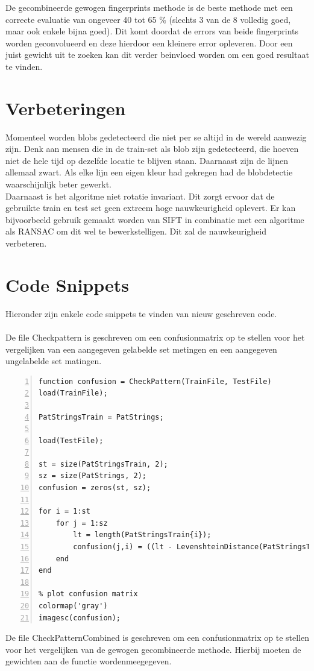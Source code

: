 \documentclass[a4paper]{article}
\begin{document}
De gecombineerde gewogen fingerprints methode is de beste methode met een correcte evaluatie van ongeveer 40 tot 65 \% (slechts 3 van de 8 volledig goed, maar ook enkele bijna goed). Dit komt doordat de errors van beide fingerprints worden geconvolueerd en deze hierdoor een kleinere error opleveren. Door een juist gewicht uit te zoeken kan dit verder beinvloed worden om een goed resultaat te vinden.

\section{Verbeteringen}
Momenteel worden blobs gedetecteerd die niet per se altijd in de wereld aanwezig zijn. Denk aan mensen die in de train-set als blob zijn gedetecteerd, die hoeven niet de hele tijd op dezelfde locatie te blijven staan. Daarnaast zijn de lijnen allemaal zwart. Als elke lijn een eigen kleur had gekregen had de blobdetectie waarschijnlijk beter gewerkt.\\
Daarnaast is het algoritme niet rotatie invariant. Dit zorgt ervoor dat de gebruikte train en test set geen extreem hoge nauwkeurigheid oplevert. Er kan bijvoorbeeld gebruik gemaakt worden van SIFT in combinatie met een algoritme als RANSAC om dit wel te bewerkstelligen. Dit zal de nauwkeurigheid verbeteren.

\section{Code Snippets}
Hieronder zijn enkele code snippets te vinden van nieuw geschreven code.\\\\
De file Checkpattern is geschreven om een confusionmatrix op te stellen voor het vergelijken van een aangegeven gelabelde set metingen en een aangegeven ungelabelde set matingen.
\begin{lstlisting}[caption= CheckPattern.m, label=lst:checkpattern, numbers=left]
function confusion = CheckPattern(TrainFile, TestFile)
load(TrainFile);

PatStringsTrain = PatStrings;

load(TestFile);

st = size(PatStringsTrain, 2);   
sz = size(PatStrings, 2);
confusion = zeros(st, sz);

for i = 1:st
	for j = 1:sz
        lt = length(PatStringsTrain{i});
	    confusion(j,i) = ((lt - LevenshteinDistance(PatStringsTrain{i}, PatStrings{j})) / lt) * 100;
	end
end

% plot confusion matrix
colormap('gray')
imagesc(confusion);
\end{lstlisting}
De file CheckPatternCombined is geschreven om een confusionmatrix op te stellen voor het vergelijken van de gewogen gecombineerde methode. Hierbij moeten de gewichten aan de functie wordenmeegegeven.
\end{document}
